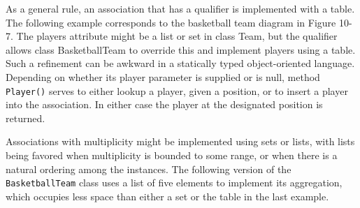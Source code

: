 
As a general rule, an association that has a qualifier is implemented
with a table. The following example corresponds to
the basketball team diagram in Figure 10-7. The players attribute might
be a list or set in class Team, but the qualifier allows class
BasketballTeam to override this and implement players using a table.
Such a refinement can be awkward in a statically typed object-oriented
language.
Depending on whether its player parameter is supplied or is null, method
\texttt{Player()} serves to either lookup a player, given a position,
or to insert a player into the association. In either case the player
at the designated position is returned.


Associations with multiplicity might be implemented using sets or lists,
with lists being favored when multiplicity is bounded to some range, or
when there is a natural ordering among the instances. The following
version of the \texttt{BasketballTeam} class uses a list of five
elements to implement its aggregation, which occupies less space than
either a set or the table in the last example.


